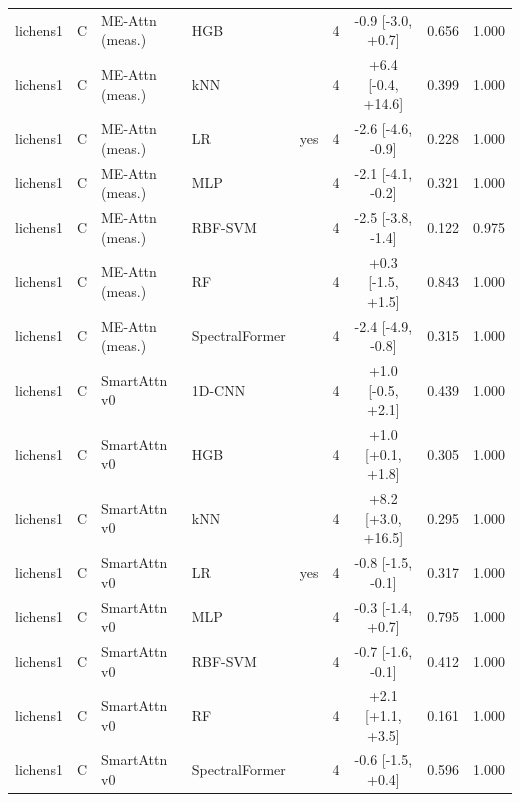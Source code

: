 \begin{tabular}{lllllcccc}
lichens1 & C & ME-Attn (meas.) & HGB &  & 4 & -0.9 [-3.0, +0.7] & 0.656 & 1.000 \\
lichens1 & C & ME-Attn (meas.) & kNN &  & 4 & +6.4 [-0.4, +14.6] & 0.399 & 1.000 \\
lichens1 & C & ME-Attn (meas.) & LR & yes & 4 & -2.6 [-4.6, -0.9] & 0.228 & 1.000 \\
lichens1 & C & ME-Attn (meas.) & MLP &  & 4 & -2.1 [-4.1, -0.2] & 0.321 & 1.000 \\
lichens1 & C & ME-Attn (meas.) & RBF-SVM &  & 4 & -2.5 [-3.8, -1.4] & 0.122 & 0.975 \\
lichens1 & C & ME-Attn (meas.) & RF &  & 4 & +0.3 [-1.5, +1.5] & 0.843 & 1.000 \\
lichens1 & C & ME-Attn (meas.) & SpectralFormer &  & 4 & -2.4 [-4.9, -0.8] & 0.315 & 1.000 \\
lichens1 & C & SmartAttn v0 & 1D-CNN &  & 4 & +1.0 [-0.5, +2.1] & 0.439 & 1.000 \\
lichens1 & C & SmartAttn v0 & HGB &  & 4 & +1.0 [+0.1, +1.8] & 0.305 & 1.000 \\
lichens1 & C & SmartAttn v0 & kNN &  & 4 & +8.2 [+3.0, +16.5] & 0.295 & 1.000 \\
lichens1 & C & SmartAttn v0 & LR & yes & 4 & -0.8 [-1.5, -0.1] & 0.317 & 1.000 \\
lichens1 & C & SmartAttn v0 & MLP &  & 4 & -0.3 [-1.4, +0.7] & 0.795 & 1.000 \\
lichens1 & C & SmartAttn v0 & RBF-SVM &  & 4 & -0.7 [-1.6, -0.1] & 0.412 & 1.000 \\
lichens1 & C & SmartAttn v0 & RF &  & 4 & +2.1 [+1.1, +3.5] & 0.161 & 1.000 \\
lichens1 & C & SmartAttn v0 & SpectralFormer &  & 4 & -0.6 [-1.5, +0.4] & 0.596 & 1.000 \\
\bottomrule
\end{tabular}
